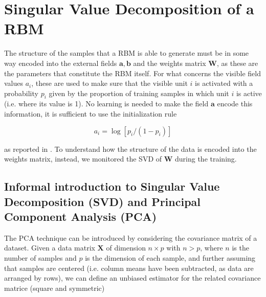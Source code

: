 \documentclass[notitlepage]{revtex4-1}
\begin{document}

\section{Singular Value Decomposition of a RBM}
The structure of the samples that a RBM  is able to generate must be in some way encoded into the external fields \(\mathbf{a},\mathbf{b}\) and the weights matrix \(\mathbf{W}\), as these are the parameters that constitute the RBM itself. For what concerns the visible field values \(a_i\), these are used to make sure that the visible unit \(i\) is activated with a probability \(p_i\) given by the proportion of training samples in which unit \(i\) is active (i.e. where its value is 1). No learning is needed to make the field \(\mathbf{a}\) encode this information, it is sufficient to use the initialization rule

\begin{equation}
a_i = \log[p_i/(1-p_i)]
\label{eq:bias_init}
\end{equation}

as reported in \cite{Hinton_guide}. To understand how the structure of the data is encoded into the weights matrix, instead, we monitored the SVD of \(\mathbf{W}\) during the training.

\subsection{Informal introduction to Singular Value Decomposition (SVD) and Principal Component Analysis (PCA)} \label{sec:svd_pca}

The PCA technique can be introduced by considering the covariance matrix of a dataset. Given a data matrix \(\mathbf{X}\) of dimension \(n \times p\) with \(n > p\), where \(n\) is the number of samples and \(p\) is the dimension of each sample, and further assuming that samples are centered (i.e. column means have been subtracted, as data are arranged by rows), we can define an unbiased estimator for the related covariance matrice (square and symmetric)

\end{document}
